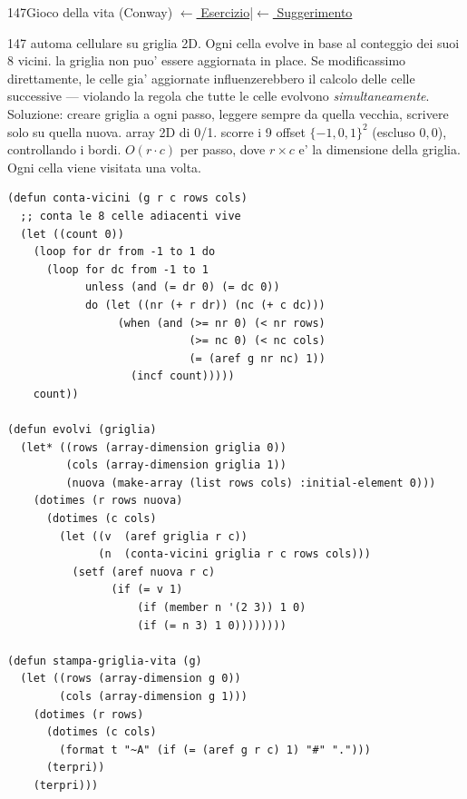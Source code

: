 \label{sol:147}
\begin{solbox}{147}{Gioco della vita (Conway)}
\small\color{black!55}\hyperref[ex:147]{$\leftarrow$ Esercizio}\enspace\textcolor{black!30}{|}\enspace\hyperref[hint:147]{$\leftarrow$ Suggerimento}\normalsize\color{black}
\begin{ragionamentoBox}{147}
 automa cellulare su griglia 2D.
Ogni cella evolve in base al conteggio dei suoi 8 vicini.
 la griglia non puo' essere aggiornata in place.
Se modificassimo  direttamente, le celle gia' aggiornate
influenzerebbero il calcolo delle celle successive — violando la regola
che tutte le celle evolvono \emph{simultaneamente}.
Soluzione: creare  griglia a ogni passo, leggere sempre da
quella vecchia, scrivere solo su quella nuova.
 array 2D di 0/1.
 scorre i 9 offset $\{-1,0,1\}^2$ (escluso $0,0$),
controllando i bordi.
 $O(r \cdot c)$ per passo, dove $r \times c$ e'
la dimensione della griglia. Ogni cella viene visitata una volta.
\end{ragionamentoBox}
\begin{lstlisting}
(defun conta-vicini (g r c rows cols)
  ;; conta le 8 celle adiacenti vive
  (let ((count 0))
    (loop for dr from -1 to 1 do
      (loop for dc from -1 to 1
            unless (and (= dr 0) (= dc 0))
            do (let ((nr (+ r dr)) (nc (+ c dc)))
                 (when (and (>= nr 0) (< nr rows)
                            (>= nc 0) (< nc cols)
                            (= (aref g nr nc) 1))
                   (incf count)))))
    count))

(defun evolvi (griglia)
  (let* ((rows (array-dimension griglia 0))
         (cols (array-dimension griglia 1))
         (nuova (make-array (list rows cols) :initial-element 0)))
    (dotimes (r rows nuova)
      (dotimes (c cols)
        (let ((v  (aref griglia r c))
              (n  (conta-vicini griglia r c rows cols)))
          (setf (aref nuova r c)
                (if (= v 1)
                    (if (member n '(2 3)) 1 0)
                    (if (= n 3) 1 0))))))))

(defun stampa-griglia-vita (g)
  (let ((rows (array-dimension g 0))
        (cols (array-dimension g 1)))
    (dotimes (r rows)
      (dotimes (c cols)
        (format t "~A" (if (= (aref g r c) 1) "#" ".")))
      (terpri))
    (terpri)))
\end{lstlisting}
\end{solbox}

